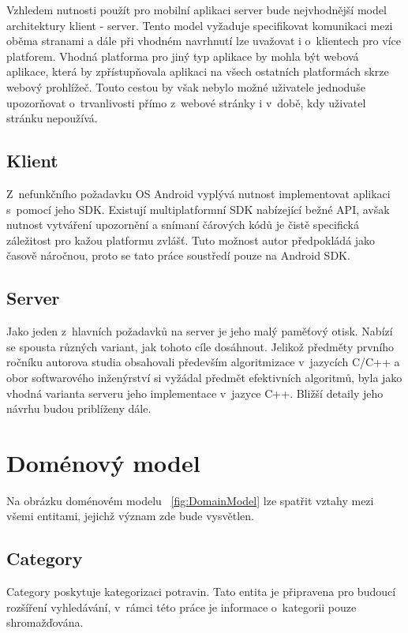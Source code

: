 \documentclass[thesis=B,czech]{FITthesis}[2013/10/20]
\begin{document}
Vzhledem nutnosti použít pro mobilní aplikaci server bude nejvhodnější model architektury klient - server. Tento model vyžaduje specifikovat komunikaci mezi oběma stranami a dále při vhodném navrhnutí lze uvažovat i o~klientech pro více platforem. Vhodná platforma pro jiný typ aplikace by mohla být webová aplikace, která by zpřístupňovala aplikaci na všech ostatních platformách skrze webový prohlížeč. Touto cestou by však nebylo možné uživatele jednoduše upozorňovat o~trvanlivosti přímo z~webové stránky i v~době, kdy uživatel stránku nepoužívá.

\subsection{Klient}

Z~nefunkčního požadavku OS Android vyplývá nutnost implementovat aplikaci s~pomocí jeho SDK. Existují multiplatformní SDK nabízející bežné API, avšak nutnost vytváření upozornění a snímaní čárových kódů je čistě specifická záležitost pro kažou platformu zvlášť. Tuto možnost autor předpokládá jako časově náročnou, proto se tato práce soustředí pouze na Android SDK.

\subsection{Server}

Jako jeden z~hlavních požadavků na server je jeho malý paměťový otisk. Nabízí se spousta různých variant, jak tohoto cíle dosáhnout. Jelikož předměty prvního ročníku autorova studia obsahovali především algoritmizace v~jazycích C/C++ a obor softwarového inženýrství si vyžádal předmět efektivních algoritmů, byla jako vhodná varianta serveru jeho implementace v~jazyce C++. Bližší detaily jeho návrhu budou priblíženy dále.

\section{Doménový model}

Na obrázku doménovém modelu ~\ref{fig:DomainModel} lze spatřit vztahy mezi všemi entitami, jejichž význam zde bude vysvětlen.

\subsection{Category}
Category poskytuje kategorizaci potravin. Tato entita je připravena pro budoucí rozšíření vyhledávání, v~rámci této práce je informace o~kategorii pouze shromažďována. 
\end{document}
